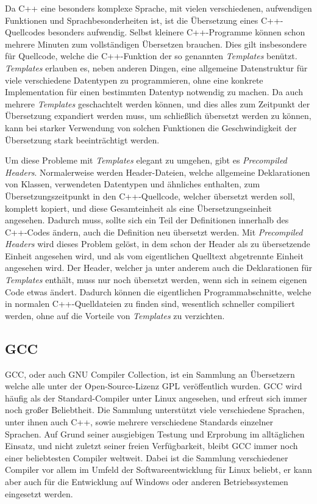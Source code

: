 Da C++ eine besonders komplexe Sprache, mit vielen verschiedenen, aufwendigen Funktionen und Sprachbesonderheiten ist, ist die Übersetzung eines C++-Quellcodes besonders aufwendig. Selbst kleinere
C++-Programme können schon mehrere Minuten zum vollständigen Übersetzen brauchen. Dies gilt insbesondere für Quellcode, welche die C++-Funktion der so genannten \textit{Templates} benützt. \textit{Templates}
erlauben es, neben anderen Dingen, eine allgemeine Datenstruktur für viele verschiedene Datentypen zu programmieren, ohne eine konkrete Implementation für einen bestimmten Datentyp notwendig zu machen.
Da auch mehrere \textit{Templates} geschachtelt werden können, und dies alles zum Zeitpunkt der Übersetzung expandiert werden muss, um schließlich übersetzt werden zu können, kann bei starker Verwendung
von solchen Funktionen die Geschwindigkeit der Übersetzung stark beeinträchtigt werden.

Um diese Probleme mit \textit{Templates} elegant zu umgehen, gibt es \textit{Precompiled Headers}. Normalerweise werden Header-Dateien, welche allgemeine Deklarationen von Klassen, verwendeten Datentypen
und ähnliches enthalten, zum Übersetzungszeitpunkt in den C++-Quellcode, welcher übersetzt werden soll, komplett kopiert, und diese Gesamteinheit als eine Über\-setzungs\-einheit angesehen. Dadurch muss, sollte
sich ein Teil der Definitionen innerhalb des C++-Codes ändern, auch die Definition neu übersetzt werden. Mit \textit{Precompiled Headers} wird dieses Problem gelöst, in dem schon der Header als zu übersetzende
Einheit angesehen wird, und als vom eigentlichen Quelltext abgetrennte Einheit angesehen wird. Der Header, welcher ja unter anderem auch die Deklarationen für \textit{Templates} enthält, muss nur noch
übersetzt werden, wenn sich in seinem eigenen Code etwas ändert. Dadurch können die eigentlichen Programmabschnitte, welche in normalen C++-Quelldateien zu finden sind, wesentlich schneller
compiliert werden, ohne auf die Vorteile von \textit{Templates} zu verzichten.


\subsection{GCC}
GCC, oder auch GNU Compiler Collection, ist ein Sammlung an Übersetzern welche alle unter der Open-Source-Lizenz GPL veröffentlich wurden. GCC wird häufig als der Standard-Compiler unter Linux angesehen,
und erfreut sich immer noch großer Beliebtheit. Die Sammlung unterstützt viele verschiedene Sprachen, unter ihnen auch C++, sowie mehrere verschiedene Standards einzelner Sprachen. Auf Grund seiner
ausgiebigen Testung und Erprobung im alltäglichen Einsatz, und nicht zuletzt seiner freien Verfügbarkeit, bleibt GCC immer noch einer beliebtesten Compiler weltweit. Dabei ist die Sammlung verschiedener
Compiler vor allem im Umfeld der Softwareentwicklung für Linux beliebt, er kann aber auch für die Entwicklung auf Windows oder anderen Betriebssystemen eingesetzt werden.

